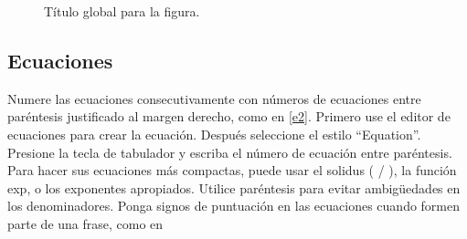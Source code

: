 \documentclass[5p,times,authoryear]{elsarticle}
\begin{document}
\begin{figure}[tb]
\centering
{}

\label{mifigura}
\caption{Título global para la figura.}
\end{figure}

\subsection{Ecuaciones}

Numere las ecuaciones consecutivamente con números de ecuaciones entre paréntesis justificado al margen derecho, como en \eqref{e2}. Primero use el editor de ecuaciones para crear la ecuación. Después seleccione el estilo ``Equation''. Presione la tecla de tabulador y escriba el número de ecuación entre paréntesis. Para hacer sus ecuaciones más compactas, puede usar el solidus ( / ), la función exp, o los exponentes apropiados. Utilice paréntesis para evitar ambigüedades en los denominadores. Ponga signos de puntuación en las ecuaciones cuando formen parte de una frase, como en
\end{document}
